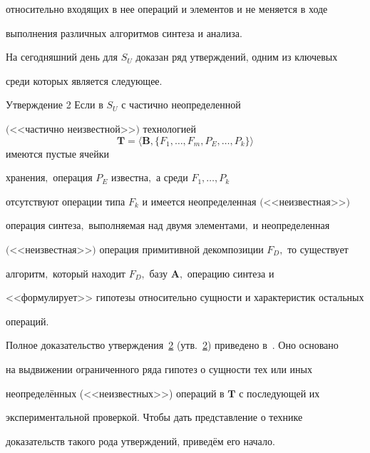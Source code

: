 относительно входящих в нее операций и элементов и не меняется в ходе

выполнения различных алгоритмов синтеза и анализа.



На сегодняшний день для $S_U$ доказан ряд утверждений, одним из ключевых

среди которых является следующее.



\smallskip



\hypertarget{kr:utv2}{}



\begin{newthm}{Утверждение 2} Если в $S_{U}$ с частично неопределенной

$($<<частично не\-из\-вест\-ной>>$)$ технологией $$\mathbf{T}=\langle \mathbf{B},

\{F_{1},\ldots, F_{m}, P_{E},\ldots, P_{k}\}\rangle$$ имеются пустые ячейки

хранения$,$ операция $P_{E}$ известна$,$ а среди $F_{1},\ldots, P_{k}$

отсутствуют операции типа $F_{k}$ и имеется неопределенная $($<<неизвестная>>$)$

операция син\-те\-за$,$ выполняемая над двумя элементами$,$ и неопределенная

$($<<неизвест\-ная>>$)$ операция примитивной декомпозиции $F_{D},$ то существует

алгоритм$,$ который находит $F_{D},$ базу $\mathbf{A},$ операцию синтеза и

<<формулирует>> гипотезы относительно сущности и характеристик остальных

операций$.$

\end{newthm}



\smallskip



Полное доказательство утверждения~\hyperlink{kr:utv2}{2} (утв.~\hyperlink{kr:utv2}{2})  приведено в~\cite{krylov:bib3}. Оно основано

на выдвижении ограниченного ряда гипотез о сущности тех или иных

неопределённых (<<неизвестных>>) операций в $\mathbf{T}$ с последующей их

экспериментальной проверкой. Чтобы дать представление о технике

доказательств такого рода утверждений, приведём его начало.




